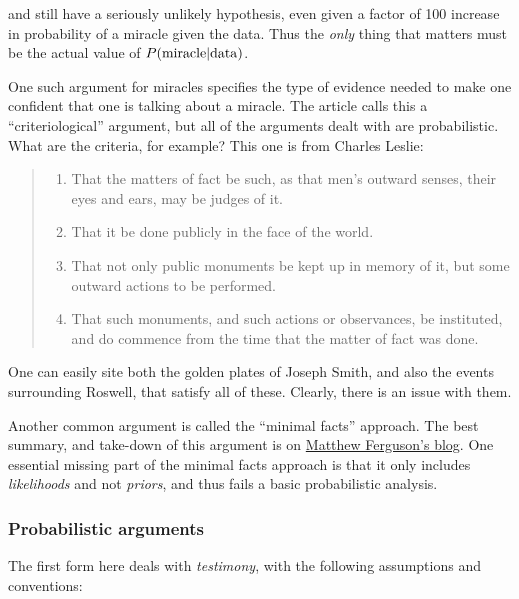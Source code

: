 \documentclass{tufte-book}
\begin{document}
and still have a seriously unlikely hypothesis, even given a factor of
100 increase in probability of a miracle given the data. Thus the
\emph{only} thing that matters must be the actual value of
\(P({\rm miracle}|{\rm data})\).

One such argument for miracles specifies the type of evidence needed to
make one confident that one is talking about a miracle. The article
calls this a ``criteriological'' argument, but all of the arguments
dealt with are probabilistic. What are the criteria, for example? This
one is from Charles Leslie:

\begin{quote}
\begin{enumerate}
\def\labelenumi{\arabic{enumi}.}
\itemsep1pt\parskip0pt
\item
  That the matters of fact be such, as that men's outward senses, their
  eyes and ears, may be judges of it.
\item
  That it be done publicly in the face of the world.
\item
  That not only public monuments be kept up in memory of it, but some
  outward actions to be performed.
\item
  That such monuments, and such actions or observances, be instituted,
  and do commence from the time that the matter of fact was done.
\end{enumerate}
\end{quote}

One can easily site both the golden plates of Joseph Smith, and also the
events surrounding Roswell, that satisfy all of these. Clearly, there is
an issue with them.

Another common argument is called the ``minimal facts'' approach. The
best summary, and take-down of this argument is on
\href{https://adversusapologetica.wordpress.com/2013/06/29/knocking-out-the-pillars-of-the-minimal-facts-apologetic/}{Matthew
Ferguson's blog}. One essential missing part of the minimal facts
approach is that it only includes \emph{likelihoods} and not
\emph{priors}, and thus fails a basic probabilistic analysis.

\subsubsection{Probabilistic arguments}\label{probabilistic-arguments}

The first form here deals with \emph{testimony}, with the following
assumptions and conventions:
\end{document}
